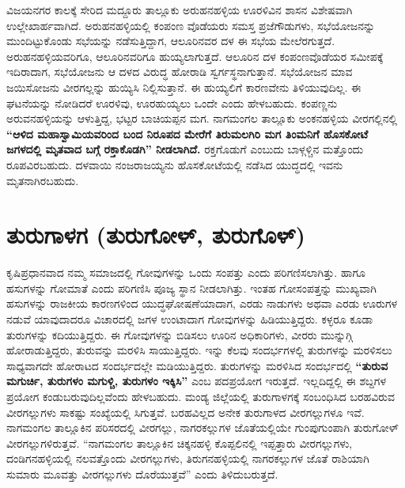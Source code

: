 ವಿಜಯನಗರ ಕಾಲಕ್ಕೆ ಸೇರಿದ ಮದ್ದೂರು ತಾಲ್ಲೂಕು ಅರುಹನಹಳ್ಳಿಯ ಊರಳಿವಿನ ಶಾಸನ ವಿಶೇಷವಾಗಿ ಉಲ್ಲೇಖಾರ್ಹವಾಗಿದೆ. ಅರುಹನಹಳ್ಳಿಯಲ್ಲಿ ಕಂಪಂಣ ವೊಡೆಯರು ಸಮಸ್ತ ಪ್ರಜೆಗೌಡುಗಳು, ಸಭೆಯೋಜನನ್ನು ಮುಂದಿಟ್ಟು\-ಕೊಂಡು ಸಭೆಯನ್ನು ನಡೆಸುತ್ತಿದ್ದಾಗ, ಆಲೂರಿನವರ ದಳ ಈ ಸಭೆಯ ಮೇಲೆರಗುತ್ತದೆ. ಅರುಹನಹಳ್ಳಿಯವರಿಗೂ, ಆಲೂರಿನವರಿಗೂ ಹುಯ್ಯಲಾಗುತ್ತದೆ. ಆಲೂರಿನ ದಳ ಕಂಪಂಣವೊಡೆಯರ ಸಮೀಪಕ್ಕೆ ಇದಿರಾದಾಗ, ಸಭೆಯೋಜನು ಆ ದಳದ ವಿರುದ್ಧ ಹೋರಾಡಿ ಸ್ವರ್ಗಸ್ಥನಾಗುತ್ತಾನೆ. ಸಭೆಯೋಜನ ಮಾವ ಜಯಿಸೋಜನು ವೀರಗಲ್ಲನ್ನು ಹುಯ್ಯಿಸಿ ನಿಲ್ಲಿಸುತ್ತಾನೆ. ಈ ಹುಯ್ಯಲಿಗೆ ಕಾರಣವೇನು ತಿಳಿಯುವುದಿಲ್ಲ. ಈ ಘಟನೆಯನ್ನು ನೋಡಿದರೆ ಊರಳಿವು, ಊರಹುಯ್ಯಲು ಒಂದೇ ಎಂದು ಹೇಳಬಹುದು. ಕಂಪಣ್ಣನು ಅರುವನಹಳ್ಳಿಯನ್ನು ಆಳುತ್ತಿದ್ದ, ಭಟ್ಟರ ಬಾಚಿಯಪ್ಪನ ಮಗ. ನಾಗಮಂಗಲ ತಾಲ್ಲೂಕು ಅಂಕನಹಳ್ಳಿಯ ವೀರಗಲ್ಲಿನಲ್ಲಿ \textbf{“ಆಳಿದ ಮಹಾಸ್ವಾಮಿಯವರಿಂದ ಬಂದ ನಿರೂಪದ ಮೇರೆಗೆ ತಿರುಮಲಗಿರಿ ಮಗ ತಿಂಮನಿಗೆ ಹೊಸಕೋಟೆ ಜಗಳದಲ್ಲಿ ಮೃತವಾದ ಬಗ್ಗೆ ರಕ್ತಾಕೊಡಗಿ” ನೀಡಲಾಗಿದೆ.} ರಕ್ತಗೊಡುಗೆ ಎಂಬುದು ಬಾಳ್ಗಳ್ಚಿನ ಮತ್ತೊಂದು ರೂಪವಿರಬಹುದು. ದಳವಾಯಿ ನಂಜರಾಜಯ್ಯನು ಹೊಸಕೋಟೆಯಲ್ಲಿ ನಡೆಸಿದ ಯುದ್ಧದಲ್ಲಿ ಇವನು ಮೃತನಾಗಿರಬಹುದು.\\[-.7cm]


\section*{ತುರುಗಾಳಗ (ತುರುಗೋಳ್​, ತುರುಗೊಳ್​)}

\vskip -2pt

ಕೃಷಿಪ್ರಧಾನವಾದ ನಮ್ಮ ಸಮಾಜದಲ್ಲಿ ಗೋವುಗಳನ್ನು ಒಂದು ಸಂಪತ್ತು ಎಂದು ಪರಿಗಣಿಸಲಾಗಿತ್ತು. ಹಾಗೂ ಹಸುಗಳನ್ನು ಗೋಮಾತೆ ಎಂದು ಪರಿಗಣಿಸಿ ಪೂಜ್ಯ ಸ್ಥಾನ ನೀಡಲಾಗಿತ್ತು. ಇಂತಹ ಗೋಸಂಪತ್ತನ್ನು ಮುಖ್ಯವಾಗಿ ಹಸುಗಳನ್ನು ರಾಜಕೀಯ ಕಾರಣಗಳಿಂದ ಯುದ್ಧಘೋಷಣೆಯಾದಾಗ, ಎರಡು ನಾಡುಗಳು ಅಥವಾ ಎರಡು ಊರುಗಳ ನಡುವೆ ಯಾವುದಾದರೂ ವಿಚಾರದಲ್ಲಿ ಜಗಳ ಉಂಟಾದಾಗ ಗೋವುಗಳನ್ನು ಹಿಡಿಯುತ್ತಿದ್ದರು. ಕಳ್ಳರೂ ಕೂಡಾ ತುರುಗಳನ್ನು ಕದಿಯುತ್ತಿದ್ದರು. ಈ ಗೋವುಗಳನ್ನು ಬಿಡಿಸಲು ಊರಿನ ಅಧಿಕಾರಿಗಳು, ವೀರರು ಮುನ್ನುಗ್ಗಿ ಹೋರಾಡುತ್ತಿದ್ದರು, ತುರುವನ್ನು ಮರಳಿಸಿ ಸಾಯುತ್ತಿದ್ದರು. ಇನ್ನು ಕೆಲವು ಸಂದರ್ಭಗಳಲ್ಲಿ ತುರುಗಳನ್ನು ಮರಳಿಸಲು ಸಾಧ್ಯವಾಗದೇ ಹೋರಾಟದ ಸಂದರ್ಭದಲ್ಲೇ ಮಡಿಯುತ್ತಿದ್ದರು. ತುರುಗಳನ್ನು ಮರಳಿಸಿದ ಸಂದರ್ಭದಲ್ಲಿ \textbf{“ತುರುವ ಮಗುರ್ಚಿ, ತುರುಗಳಂ ಮಗುಳ್ಚಿ, ತುರುಗಳಂ ಇಕ್ಕಿಸಿ”} ಎಂಬ ಪದಪ್ರಯೋಗ ಇರುತ್ತದೆ. ಇಲ್ಲದಿದ್ದಲ್ಲಿ ಈ ಶಬ್ದಗಳ ಪ್ರಯೋಗ ಕಂಡುಬರುವುದಿಲ್ಲವೆಂದು ಹೇಳಬಹುದು. ಮಂಡ್ಯ ಜಿಲ್ಲೆಯಲ್ಲಿ ತುರುಗಾಳಗಕ್ಕೆ ಸಂಬಂಧಿಸಿದ ಬರಹವಿರುವ ವೀರಗಲ್ಲುಗಳು ಸಾಕಷ್ಟು ಸಂಖ್ಯೆಯಲ್ಲಿ ಸಿಗುತ್ತವೆ. ಬರಹವಿಲ್ಲದ ಅನೇಕ ತುರುಗಾಳದ ವೀರಗಲ್ಲುಗಳೂ ಇವೆ. ನಾಗಮಂಗಲ ತಾಲ್ಲೂಕಿನ ಪರಿಸರದಲ್ಲಿ ವೀರಗಲ್ಲು, ನಾಗರಕಲ್ಲುಗಳ ಜೊತೆಯಲ್ಲಿಯೇ ಗುಂಪುಗುಂಪಾಗಿ ತುರುಗೋಳ್​ ವೀರಗಲ್ಲುಗಳಿರುತ್ತವೆ. “ನಾಗಮಂಗಲ ತಾಲ್ಲೂಕಿನ ಚಿಕ್ಕನಹಳ್ಳಿ ಕೊಪ್ಪಲಿನಲ್ಲಿ ಇಪ್ಪತ್ತಾರು ವೀರಗಲ್ಲುಗಳು, ದಂಡಿಗನಹಳ್ಳಿಯಲ್ಲಿ ನಲವತ್ತೊಂದು ವೀರಗಲ್ಲುಗಳು, ತಿರುಗನಹಳ್ಳಿಯಲ್ಲಿ ನಾಗರಕಲ್ಲುಗಳ ಜೊತೆ ರಾಶಿಯಾಗಿ ಸುಮಾರು ಮೂವತ್ತು ವೀರಗಲ್ಲುಗಳು ದೊರೆಯುತ್ತವೆ” ಎಂದು ತಿಳಿದುಬರುತ್ತದೆ.

